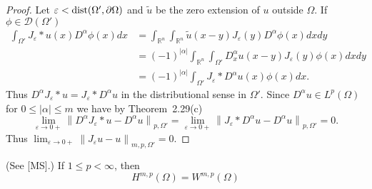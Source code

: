 \begin{proof}
  Let $\varepsilon<\operatorname{dist} (\Omega', \partial\Omega)$ 
  and $\tilde{u}$ be the zero extension of $u$ outside $\Omega$.
  If $\phi \in \mathscr{D}\left(\Omega'\right)$
  \[
  \begin{aligned}
    \int_{\Omega'} J_\varepsilon * u(x) D^\alpha \phi(x) d x
    & = \int_{\mathbb{R}^n} \int_{\mathbb{R}^n} \tilde{u}(x-y) J_\varepsilon(y) 
        D^\alpha \phi(x) d x d y \\
    & = (-1)^{|\alpha|} \int_{\mathbb{R}^n} \int_{\Omega'}
        D_x^\alpha u(x-y) J_\varepsilon(y) \phi(x) d x d y \\
    & = (-1)^{|\alpha|} \int_{\Omega'} J_\varepsilon * D^\alpha u(x) \phi(x) d x .
  \end{aligned}
  \]
  Thus $D^\alpha J_\varepsilon * u=J_\varepsilon * D^\alpha u$ in the distributional sense
  in $\Omega'$. Since $D^\alpha u \in L^p(\Omega)$ for $0 \leq|\alpha| \leq m$
  we have by Theorem~2.29(c)
  \[
  \lim _{\varepsilon \rightarrow 0+}\left\|D^\alpha J_\varepsilon * u-D^\alpha u\right\|_{p, \Omega'}=\lim _{\varepsilon \rightarrow 0+}\left\|J_\varepsilon * D^\alpha u-D^\alpha u\right\|_{p, \Omega'}=0 .
  \]
  Thus $\lim _{\varepsilon \rightarrow 0+}\left\|J_\varepsilon u-u\right\|_{m, p, \Omega'}=0$.
\end{proof}


\begin{theorem}[$\bm{H} = \bm{W}$]
  (See [MS].) If $1 \leq p<\infty$, then
  \[
  H^{m, p}(\Omega)=W^{m, p}(\Omega)
  \]
\end{theorem}

